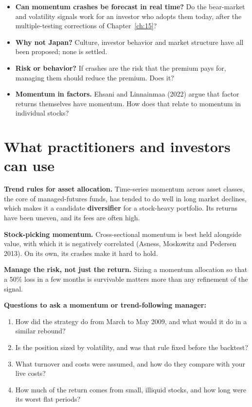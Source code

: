 \begin{itemize}
  \item \textbf{Can momentum crashes be forecast in real time?} Do the bear-market and volatility signals work for an investor who adopts them today, after the multiple-testing corrections of Chapter~\ref{ch:15}?
  \item \textbf{Why not Japan?} Culture, investor behavior and market structure have all been proposed; none is settled.
  \item \textbf{Risk or behavior?} If crashes are the risk that the premium pays for, managing them should reduce the premium. Does it?
  \item \textbf{Momentum in factors.} Ehsani and Linnainmaa (2022) argue that factor returns themselves have momentum. How does that relate to momentum in individual stocks?
\end{itemize}

\section{What practitioners and investors can use}
\label{sec:05-investors}

\textbf{Trend rules for asset allocation.} Time-series momentum across asset classes, the core of managed-futures funds, has tended to do well in long market declines, which makes it a candidate \textbf{diversifier} for a stock-heavy portfolio. Its returns have been uneven, and its fees are often high.

\textbf{Stock-picking momentum.} Cross-sectional momentum is best held alongside value, with which it is negatively correlated (Asness, Moskowitz and Pedersen 2013). On its own, its crashes make it hard to hold.

\textbf{Manage the risk, not just the return.} Sizing a momentum allocation so that a 50\% loss in a few months is survivable matters more than any refinement of the signal.

\textbf{Questions to ask a momentum or trend-following manager:}

\begin{enumerate}
  \item How did the strategy do from March to May 2009, and what would it do in a similar rebound?
  \item Is the position sized by volatility, and was that rule fixed before the backtest?
  \item What turnover and costs were assumed, and how do they compare with your live costs?
  \item How much of the return comes from small, illiquid stocks, and how long were its worst flat periods?
\end{enumerate}

